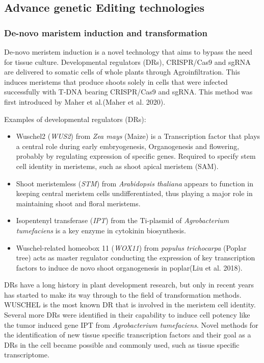 \documentclass[
]{article}
\begin{document}
\hypertarget{advance-genetic-editing-technologies}{%
\subsection{Advance genetic Editing
technologies}\label{advance-genetic-editing-technologies}}

\hypertarget{de-novo-maristem-induction-and-transformation}{%
\subsubsection{De-novo maristem induction and
transformation}\label{de-novo-maristem-induction-and-transformation}}

De-novo meristem induction is a novel technology that aims to bypass the
need for tissue culture. Developmental regulators (DRs), CRISPR/Cas9 and
sgRNA are delivered to somatic cells of whole plants through
Agroinfiltration. This induces meristems that produce shoots solely in
cells that were infected successfully with T-DNA bearing CRISPR/Cas9 and
sgRNA. This method was first introduced by Maher et al.(Maher et al.
2020).

Examples of developmental regulators (DRs):

\begin{itemize}
\item
  Wuschel2 (\emph{WUS2}) from \emph{Zea mays} (Maize) is a Transcription
  factor that plays a central role during early embryogenesis,
  Organogenesis and flowering, probably by regulating expression of
  specific genes. Required to specify stem cell identity in meristems,
  such as shoot apical meristem (SAM).
\item
  Shoot meristemless (\emph{STM}) from \emph{Arabidopsis thaliana}
  appears to function in keeping central meristem cells
  undifferentiated, thus playing a major role in maintaining shoot and
  floral meristems.
\item
  Isopentenyl transferase (\emph{IPT}) from the Ti-plasmid of
  \emph{Agrobacterium tumefaciens} is a key enzyme in cytokinin
  biosynthesis.
\item
  Wuschel-related homeobox 11 (\emph{WOX11}) from \emph{populus
  trichocarpa} (Poplar tree) acts as master regulator conducting the
  expression of key transcription factors to induce de novo shoot
  organogenesis in poplar(Liu et al. 2018).
\end{itemize}

DRs have a long history in plant development research, but only in
recent years has started to make its way through to the field of
transformation methods. WUSCHEL is the most known DR that is involved in
the meristem cell identity. Several more DRs were identified in their
capability to induce cell potency like the tumor induced gene IPT from
\emph{Agrobacterium tumefaciens}. Novel methods for the identification
of new tissue specific transcription factors and their goal as a DRs in
the cell became possible and commonly used, such as tissue specific
transcriptome.
\end{document}
